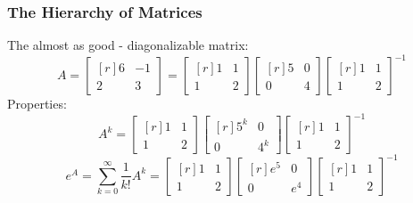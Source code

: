 \documentclass[10pt]{beamer}
\begin{document}
\begin{frame}
\frametitle{The Hierarchy of Matrices}
The almost as good - diagonalizable matrix: 
\[
A = \begin{bmatrix*}[r]
6&-1\\
2&3
\end{bmatrix*} =  \begin{bmatrix*}[r]
1&1\\
1&2
\end{bmatrix*}
\begin{bmatrix*}[r]
5&0\\
0&4
\end{bmatrix*}
\begin{bmatrix*}[r]
1&1\\
1&2
\end{bmatrix*}^{-1}
\]
\pause
Properties:
\[
A^k =  \begin{bmatrix*}[r]
1&1\\
1&2
\end{bmatrix*}
\begin{bmatrix*}[r]
5^k&0\\
0&4^k
\end{bmatrix*}
\begin{bmatrix*}[r]
1&1\\
1&2
\end{bmatrix*}^{-1}
\]
\pause
\[
e^A =  \sum_{k = 0}^\infty \frac{1}{k!}A^k = \begin{bmatrix*}[r]
1&1\\
1&2
\end{bmatrix*}
\begin{bmatrix*}[r]
e^5&0\\
0&e^4
\end{bmatrix*}
\begin{bmatrix*}[r]
1&1\\
1&2
\end{bmatrix*}^{-1}
\]
\end{frame}
\end{document}
